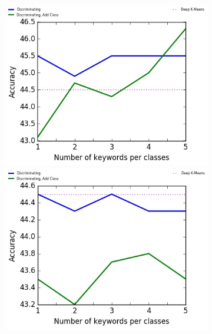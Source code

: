 \begin{figure}[!h]
\begin{subfigure}[b]{\textwidth}
\begin{minipage}{0.5\linewidth}
\centering
  \includegraphics[scale=0.49]{parts/res/dat_file/acc/20NEWS_noisy.jpg}     
\end{minipage}
  \begin{minipage}{0.5\linewidth}
\centering
   \includegraphics[scale=0.49]{parts/res/dat_file/acc/20NEWS_noisy_simple.jpg}     
\end{minipage}
\end{subfigure}
\begin{subfigure}[b]{\textwidth}

\end{subfigure}
\end{figure}
